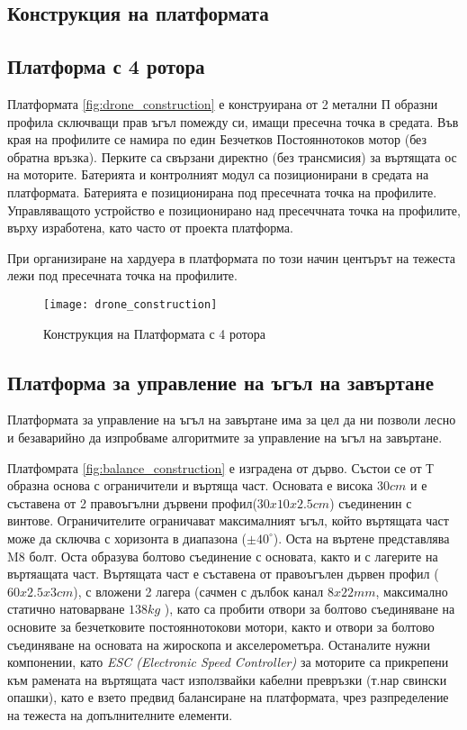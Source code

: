 \subsection{Конструкция на платформата}

\subsection{Платформа с 4 ротора}
\FloatBarrier

Платформата \autoref{fig:drone_construction} е конструирана от 2 метални П образни профила сключващи прав ъгъл помежду си, имащи пресечна точка в средата.
Във края на профилите се намира по един Безчетков Постояннотоков мотор (без обратна връзка).
Перките са свързани директно (без трансмисия) за въртящата ос на моторите.
Батерията и контролният модул са позиционирани в средата на платформата.
Батерията е позиционирана под пресечната точка на профилите.
Управляващото устройство е позиционирано над пресеччната точка на профилите,
върху изработена, като часто от проекта платформа.

При организиране на хардуера в платформата по този начин центърът на тежеста лежи под пресечната точка на профилите.

\begin{figure}[htpb!]
    \centering
    \texttt{[image: drone\_construction]}
    \caption{Конструкция на Платформата с 4 ротора}
    \label{fig:drone_construction}
\end{figure}



\FloatBarrier
\subsection{Платформа за управление на ъгъл на завъртане}
\FloatBarrier

Платформата за управление на ъгъл на завъртане има за цел да ни позволи лесно и безаварийно да изпробваме алгоритмите за управление на ъгъл на завъртане.

Платфомрата \autoref{fig:balance_construction} е изградена от дърво.
Състои се от Т образна основа с ограничители и въртяща част.
Основата е висока \(30cm\) и е съставена от 2 правоъгълни дървени профил(\(30x10x2.5cm\)) съединенин с винтове. 
Ограничителите ограничават максималният ъгъл, който въртящата част може да сключва с хоризонта в диапазона (\(\pm 40^{\circ}\)).
Оста на въртене представлява M8 болт.
Оста образува болтово съединение с основата, както и с лагерите на въртяащата част.
Въртящата част е съставена от правоъгълен дървен профил (\(60x2.5x3cm\)), с вложени 2 лагера 
(сачмен с дълбок канал \(8x22mm\), максимално статично натоварване \(138kg\) \cite{datasheet_bearing}),
като са пробити отвори за болтово съединяване на основите за безчетковите постояннотокови мотори,
както и отвори за болтово съединяване на основата на жироскопа и акселерометъра.
Останалите нужни компонении, като \textit{ESC (Electronic Speed Controller)} за моторите са прикрепени към рамената на въртящата
част използвайки кабелни превръзки (т.нар свински опашки), като е взето предвид балансиране на платформата,
чрез разпределение на тежеста на допълнителните елементи.

